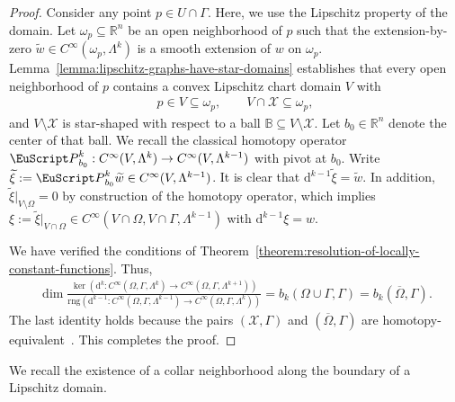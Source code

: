 \documentclass[10pt,a4paper]{amsart}
\theoremstyle{definition}
\theoremstyle{remark}
\numberwithin{equation}{section}
\newcommand{\bbB}{{\mathbb B}}
\newcommand{\bbR}{{\mathbb R}}
\newcommand{\calX}{{\mathcal X}}
\newcommand{\euP}{{\EuScript P}}
\newcommand{\closure}{\overline}
\renewcommand{\restriction}{|}
\newcommand{\smallball}{\bbB}
\newcommand{\cartan}{{\mathrm d}}
\newcommand{\Domain}{{\Omega}}
\newcommand{\subdomain}{{\omega}}
\newcommand{\Alt}[1]{\Lambda^{#1}}
\newcommand{\Poincare}{\euP}
\newcommand{\rng}{\mathrm{rng}}
\begin{document}
\begin{proof}
    Consider any point $p \in U \cap \Gamma$. Here, we use the Lipschitz property of the domain. 
    Let $\subdomain_{p} \subseteq \bbR^{n}$ be an open neighborhood of $p$ such that the extension-by-zero $\widetilde{w} \in C^{\infty}(\subdomain_{p},\Alt{k})$ is a smooth extension of $w$ on $\subdomain_{p}$.
Lemma~\ref{lemma:lipschitz-graphs-have-star-domains} establishes that every open neighborhood of $p$ 
    contains a convex Lipschitz chart domain $V$ with 
    \begin{align*}
        p \in V \subseteq \subdomain_{p}
        ,
        \qquad 
        V \cap \calX \subseteq \subdomain_{p}
        ,
    \end{align*}
    and $V \setminus \calX$ is star-shaped with respect to a ball $\smallball \subseteq V \setminus \calX$.
    Let $b_0 \in \bbR^{n}$ denote the center of that ball. 
    We recall the classical homotopy operator $\Poincare^{k}_{b_{0}} : C^{\infty}(V,\Alt{k}) \to C^{\infty}(V,\Alt{k-1})$ with pivot at $b_0$. 
    Write $\widetilde{\xi} := \Poincare^{k}_{b_{0}} \widetilde{w} \in C^{\infty}(V,\Alt{k-1})$. 
    It is clear that $\cartan^{k-1} \widetilde{\xi} = \widetilde{w}$. 
    In addition, $\widetilde{\xi} \restriction_{ V \setminus \Domain } = 0$ by construction of the homotopy operator,
    which implies $\xi := \widetilde{\xi} \restriction_{V \cap \Domain} \in C^{\infty}(V \cap \Domain,V \cap \Gamma,\Alt{k-1})$ with $\cartan^{k-1} \xi = w$.
    
    We have verified the conditions of Theorem~\ref{theorem:resolution-of-locally-constant-functions}.
    Thus,
    \begin{align*}
        \dim 
        \frac{ 
            \ker\left( \cartan^{k} : C^{\infty}(\Domain,\Gamma,\Alt{k}) \to C^{\infty}(\Domain,\Gamma,\Alt{k+1}) \right)
        }{
            \rng\left( \cartan^{k-1} : C^{\infty}(\Domain,\Gamma,\Alt{k-1}) \to C^{\infty}(\Domain,\Gamma,\Alt{k}) \right)
        } 
        = 
        b_{k}(\Domain\cup\Gamma,\Gamma)
        = 
        b_{k}(\closure\Domain,\Gamma)
        .
    \end{align*}
    The last identity holds because the pairs $(\calX,\Gamma)$ and $(\closure\Domain,\Gamma)$ are homotopy-equivalent~\cite[2.4.2, 2.4.3]{stocker_zieschang}.
This completes the proof. 
\end{proof}

We recall the existence of a collar neighborhood along the boundary of a Lipschitz domain. 
\end{document}
